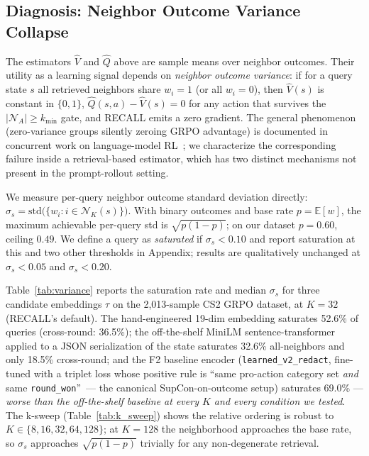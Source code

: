 \documentclass{article}
\begin{document}
\subsection{Diagnosis: Neighbor Outcome Variance Collapse}
\label{sec:diagnostic}

The estimators $\hat{V}$ and $\hat{Q}$ above are sample means over neighbor outcomes. Their utility as a learning signal depends on \emph{neighbor outcome variance}: if for a query state $s$ all retrieved neighbors share $w_i = 1$ (or all $w_i = 0$), then $\hat{V}(s)$ is constant in $\{0, 1\}$, $\hat{Q}(s,a) - \hat{V}(s) = 0$ for any action that survives the $|\mathcal{N}_A| \geq k_{\min}$ gate, and RECALL emits a zero gradient. The general phenomenon (zero-variance groups silently zeroing GRPO advantage) is documented in concurrent work on language-model RL~\cite{zerovariance2025,ngrpo2025}; we characterize the corresponding failure inside a retrieval-based estimator, which has two distinct mechanisms not present in the prompt-rollout setting.

We measure per-query neighbor outcome standard deviation directly: $\sigma_s = \mathrm{std}\bigl(\{w_i : i \in \mathcal{N}_K(s)\}\bigr)$. With binary outcomes and base rate $p = \mathbb{E}[w]$, the maximum achievable per-query std is $\sqrt{p(1-p)}$; on our dataset $p = 0.60$, ceiling $0.49$. We define a query as \emph{saturated} if $\sigma_s < 0.10$ and report saturation at this and two other thresholds in Appendix; results are qualitatively unchanged at $\sigma_s < 0.05$ and $\sigma_s < 0.20$.

Table~\ref{tab:variance} reports the saturation rate and median $\sigma_s$ for three candidate embeddings $\tau$ on the 2{,}013-sample CS2 GRPO dataset, at $K{=}32$ (RECALL's default). The hand-engineered 19-dim embedding saturates 52.6\% of queries (cross-round: 36.5\%); the off-the-shelf MiniLM sentence-transformer applied to a JSON serialization of the state saturates 32.6\% all-neighbors and only 18.5\% cross-round; and the F2 baseline encoder (\texttt{learned\_v2\_redact}, fine-tuned with a triplet loss whose positive rule is ``same pro-action category set \emph{and} same \texttt{round\_won}''~--- the canonical SupCon-on-outcome setup) saturates 69.0\% --- \emph{worse than the off-the-shelf baseline at every $K$ and every condition we tested}. The k-sweep (Table~\ref{tab:k_sweep}) shows the relative ordering is robust to $K \in \{8, 16, 32, 64, 128\}$; at $K{=}128$ the neighborhood approaches the base rate, so $\sigma_s$ approaches $\sqrt{p(1-p)}$ trivially for any non-degenerate retrieval.
\end{document}
